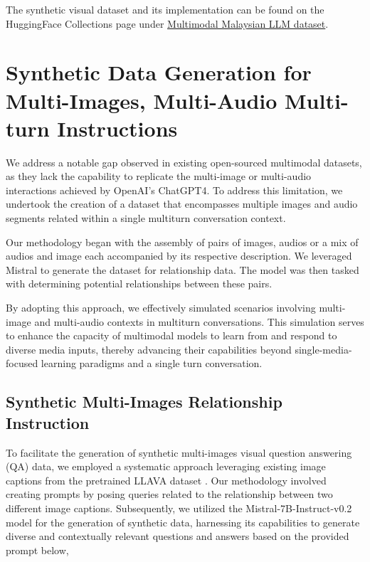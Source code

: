\documentclass[preprint]{article}
\begin{document}
The synthetic visual dataset and its implementation can be found on the HuggingFace Collections page under \href{https://huggingface.co/collections/mesolitica/multimodal-malaysian-llm-dataset-653a16214037a1bc4417eb3a}{Multimodal Malaysian LLM dataset}.

\section{Synthetic Data Generation for Multi-Images, Multi-Audio Multi-turn Instructions}

We address a notable gap observed in existing open-sourced multimodal datasets, as they lack the capability to replicate the multi-image or multi-audio interactions achieved by OpenAI's ChatGPT4. To address this limitation, we undertook the creation of a dataset that encompasses multiple images and audio segments related within a single multiturn conversation context.

Our methodology began with the assembly of pairs of images, audios or a mix of audios and image each accompanied by its respective description. We leveraged Mistral to generate the dataset for relationship data. The model was then tasked with determining potential relationships between these pairs.

By adopting this approach, we effectively simulated scenarios involving multi-image and multi-audio contexts in multiturn conversations. This simulation serves to enhance the capacity of multimodal models to learn from and respond to diverse media inputs, thereby advancing their capabilities beyond single-media-focused learning paradigms and a single turn conversation.

\subsection{Synthetic Multi-Images Relationship Instruction}

To facilitate the generation of synthetic multi-images visual question answering (QA) data, we employed a systematic approach leveraging existing image captions from the pretrained LLAVA dataset \cite{liu2023visual}. Our methodology involved creating prompts by posing queries related to the relationship between two different image captions. Subsequently, we utilized the Mistral-7B-Instruct-v0.2 model \cite{jiang2023mistral} for the generation of synthetic data, harnessing its capabilities to generate diverse and contextually relevant questions and answers based on the provided prompt below,
\end{document}
